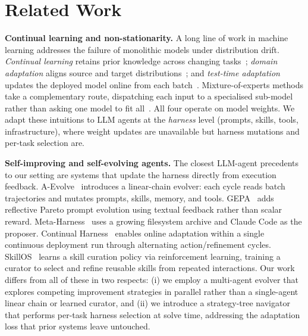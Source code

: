 
\section{Related Work}
\label{sec:related}

\noindent\textbf{Continual learning and non-stationarity.}
A long line of work in machine learning addresses the failure of monolithic models under distribution drift. \emph{Continual learning} retains prior knowledge across changing tasks~\cite{kirkpatrick2017ewc,delange2021cl}; \emph{domain adaptation} aligns source and target distributions~\cite{ben-david2010da,ganin2016dann}; and \emph{test-time adaptation} updates the deployed model online from each batch~\cite{wang2021tent,liang2020shot}. Mixture-of-experts methods take a complementary route, dispatching each input to a specialised sub-model rather than asking one model to fit all~\cite{jacobs1991moe,shazeer2017moe}. All four operate on model weights. We adapt these intuitions to LLM agents at the \emph{harness} level (prompts, skills, tools, infrastructure), where weight updates are unavailable but harness mutations and per-task selection are.

\noindent\textbf{Self-improving and self-evolving agents.}
The closest LLM-agent precedents to our setting are systems that update the harness directly from execution feedback. A-Evolve~\cite{aevolve} introduces a linear-chain evolver: each cycle reads batch trajectories and mutates prompts, skills, memory, and tools. GEPA~\cite{gepa2025} adds reflective Pareto prompt evolution using textual feedback rather than scalar reward. Meta-Harness~\cite{metaharness2026} uses a growing filesystem archive and Claude Code as the proposer. Continual Harness~\cite{continualharness2025} enables online adaptation within a single continuous deployment run through alternating action/refinement cycles. SkillOS~\cite{skillos2025} learns a skill curation policy via reinforcement learning, training a curator to select and refine reusable skills from repeated interactions. Our work differs from all of these in two respects: (i) we employ a multi-agent evolver that explores competing improvement strategies in parallel rather than a single-agent linear chain or learned curator, and (ii) we introduce a strategy-tree navigator that performs per-task harness selection at solve time, addressing the adaptation loss that prior systems leave untouched.
